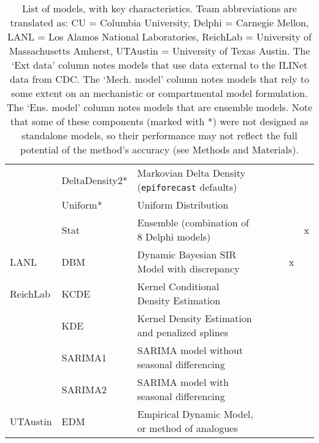 \begin{table*}
\begin{tabular}{p{1.6cm} l p{7.5cm} l  p{1cm}  p{1cm} p{1cm}}
~        & DeltaDensity2*      & Markovian Delta Density ({\tt epiforecast} defaults)& \cite{Brooks2018} & ~             & ~          &          \\ 
~        & Uniform*            & Uniform Distribution&  & ~             & ~   &                 \\ 
~        & Stat               & Ensemble (combination of 8 Delphi models)& \cite{Brooks2018} & ~             & ~  & x                 \\
\hline
LANL     & DBM                & Dynamic Bayesian SIR Model with discrepancy & \cite{osthus2018dynamic} & ~             & x      &              \\ 
\hline
ReichLab & KCDE               & Kernel Conditional Density Estimation & \cite{Ray2017}  & ~             & ~            &        \\ 
~        & KDE                & Kernel Density Estimation and penalized splines & \cite{Ray2018}  & ~             & ~     &               \\ 
~        & SARIMA1            & SARIMA model without seasonal differencing & \cite{Ray2018} & ~             & ~      &              \\ 
~        & SARIMA2            & SARIMA model with seasonal differencing & \cite{Ray2018} & ~             & ~           &         \\ 
\hline
UTAustin & EDM                & Empirical Dynamic Model, or method of analogues & \cite{Sugihara1990} & ~             & ~         &           \\ 
\end{tabular}
\caption{List of models, with key characteristics. Team abbreviations are translated as: CU = Columbia University, Delphi = Carnegie Mellon, LANL = Los Alamos National Laboratories, ReichLab = University of Massachusetts Amherst, UTAustin = University of Texas Austin.  The `Ext data' column notes models that use data external to the ILINet data from CDC. The `Mech. model' column notes models that rely to some extent on an mechanistic or compartmental model formulation. The `Ens. model' column notes models that are ensemble models. Note that some of these components (marked with *) were not designed as standalone models, so their performance may not reflect the full potential of the method’s accuracy (see Methods and Materials).}
\label{tab:model-list}
\end{table*}
